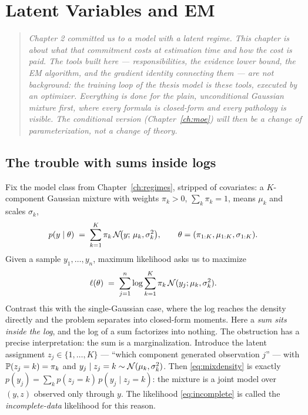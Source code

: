 \chapter{Latent Variables and EM}\label{ch:em}

\begin{quote}\itshape
Chapter 2 committed us to a model with a latent regime. This chapter is
about what that commitment costs at estimation time and how the cost is
paid. The tools built here --- responsibilities, the evidence lower bound,
the EM algorithm, and the gradient identity connecting them --- are not
background: the training loop of the thesis model \emph{is} these tools,
executed by an optimizer. Everything is done for the plain, unconditional
Gaussian mixture first, where every formula is closed-form and every
pathology is visible. The conditional version (Chapter~\ref{ch:moe}) will
then be a change of parameterization, not a change of theory.
\end{quote}

\section{The trouble with sums inside logs}\label{sec:sumslogs}

Fix the model class from Chapter~\ref{ch:regimes}, stripped of covariates: a
$K$-component Gaussian mixture with weights $\pi_k > 0$, $\sum_k \pi_k = 1$,
means $\mu_k$ and scales $\sigma_k$,
\begin{equation}\label{eq:mixdensity}
  p(y \mid \theta) \;=\; \sum_{k=1}^{K} \pi_k\,
  \mathcal{N}\!\bigl(y;\, \mu_k, \sigma_k^2\bigr),
  \qquad \theta = (\pi_{1:K}, \mu_{1:K}, \sigma_{1:K}).
\end{equation}
Given a sample $y_1, \dots, y_n$, maximum likelihood asks us to maximize
\begin{equation}\label{eq:incomplete}
  \ell(\theta) \;=\; \sum_{j=1}^{n} \log
  \sum_{k=1}^{K} \pi_k\, \mathcal{N}(y_j; \mu_k, \sigma_k^2).
\end{equation}
Contrast this with the single-Gaussian case, where the log reaches the
density directly and the problem separates into closed-form moments. Here a
\emph{sum sits inside the log}, and the log of a sum factorizes into
nothing. The obstruction has a precise interpretation: the sum is a
marginalization. Introduce the latent assignment $z_j \in \{1,\dots,K\}$
--- ``which component generated observation $j$'' --- with
$\mathbb{P}(z_j = k) = \pi_k$ and $y_j \mid z_j = k \sim
\mathcal{N}(\mu_k, \sigma_k^2)$. Then \eqref{eq:mixdensity} is exactly
$p(y_j) = \sum_k p(z_j = k)\, p(y_j \mid z_j = k)$: the mixture is a joint
model over $(y, z)$ observed only through $y$. The likelihood
\eqref{eq:incomplete} is called the \emph{incomplete-data} likelihood for
this reason.

